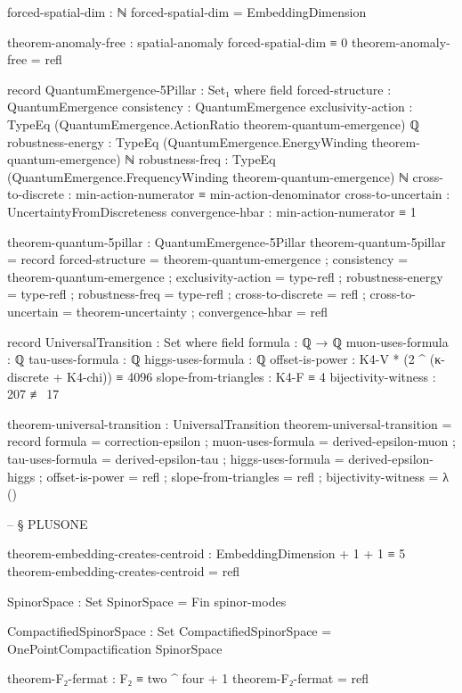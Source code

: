 \documentclass[11pt,a4paper]{book}
\begin{document}
\begin{code}
forced-spatial-dim : ℕ
forced-spatial-dim = EmbeddingDimension

theorem-anomaly-free : spatial-anomaly forced-spatial-dim ≡ 0
theorem-anomaly-free = refl

record QuantumEmergence-5Pillar : Set₁ where
  field
    forced-structure    : QuantumEmergence
    consistency         : QuantumEmergence
    exclusivity-action  : TypeEq (QuantumEmergence.ActionRatio theorem-quantum-emergence) ℚ
    robustness-energy   : TypeEq (QuantumEmergence.EnergyWinding theorem-quantum-emergence) ℕ
    robustness-freq     : TypeEq (QuantumEmergence.FrequencyWinding theorem-quantum-emergence) ℕ
    cross-to-discrete   : min-action-numerator ≡ min-action-denominator
    cross-to-uncertain  : UncertaintyFromDiscreteness
    convergence-hbar    : min-action-numerator ≡ 1

theorem-quantum-5pillar : QuantumEmergence-5Pillar
theorem-quantum-5pillar = record
  { forced-structure    = theorem-quantum-emergence
  ; consistency         = theorem-quantum-emergence
  ; exclusivity-action  = type-refl
  ; robustness-energy   = type-refl
  ; robustness-freq     = type-refl
  ; cross-to-discrete   = refl
  ; cross-to-uncertain  = theorem-uncertainty
  ; convergence-hbar    = refl
  }

record UniversalTransition : Set where
  field
    formula : ℚ → ℚ
    muon-uses-formula : ℚ
    tau-uses-formula : ℚ
    higgs-uses-formula : ℚ
    offset-is-power : K4-V * (2 ^ (κ-discrete + K4-chi)) ≡ 4096
    slope-from-triangles : K4-F ≡ 4
    bijectivity-witness : 207 ≢ 17

theorem-universal-transition : UniversalTransition
theorem-universal-transition = record
  { formula = correction-epsilon
  ; muon-uses-formula = derived-epsilon-muon
  ; tau-uses-formula = derived-epsilon-tau
  ; higgs-uses-formula = derived-epsilon-higgs
  ; offset-is-power = refl
  ; slope-from-triangles = refl
  ; bijectivity-witness = λ ()
  }


-- § PLUSONE



theorem-embedding-creates-centroid : EmbeddingDimension + 1 + 1 ≡ 5
theorem-embedding-creates-centroid = refl

SpinorSpace : Set
SpinorSpace = Fin spinor-modes

CompactifiedSpinorSpace : Set
CompactifiedSpinorSpace = OnePointCompactification SpinorSpace


theorem-F₂-fermat : F₂ ≡ two ^ four + 1
theorem-F₂-fermat = refl


\end{code}
\end{document}

